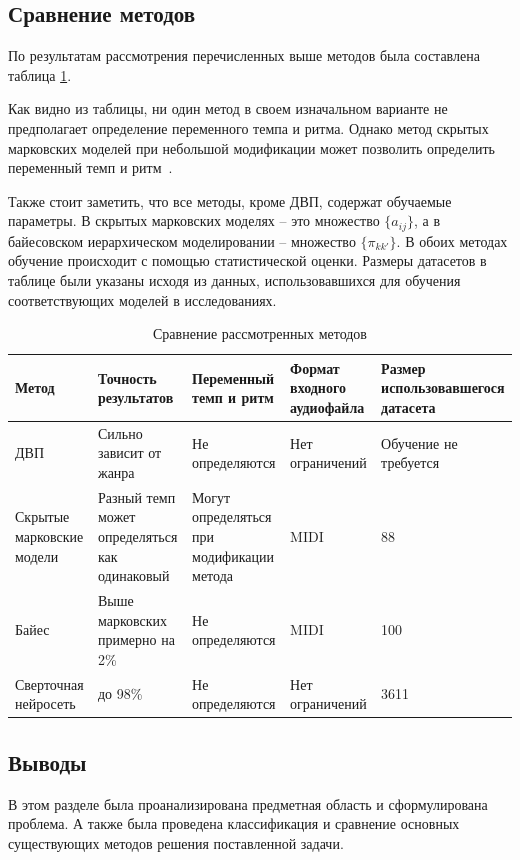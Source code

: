 \subsection{Сравнение методов}

По результатам рассмотрения перечисленных выше методов была составлена таблица \ref{tbl:compare}.

Как видно из таблицы, ни один метод в своем изначальном варианте не предполагает определение переменного темпа и ритма. Однако метод скрытых марковских моделей при небольшой модификации может позволить определить переменный темп и ритм~\cite{hmm}.

Также стоит заметить, что все методы, кроме ДВП, содержат обучаемые параметры. В скрытых марковских моделях -- это множество $\{a_{ij}\}$, а в байесовском иерархическом моделировании -- множество $\{\pi_{kk'}\}$. В обоих методах обучение происходит с помощью статистической оценки. Размеры датасетов в таблице были указаны исходя из данных, использовавшихся для обучения соответствующих моделей в исследованиях.

\begin{table}[h!]
	\begin{center}
		\caption{\label{tbl:compare}Сравнение рассмотренных методов}
		\begin{tabular}{|p{2.5cm}|p{2.5cm}|p{3cm}|p{3cm}|p{3cm}|}
			\hline
			Метод & Точность результатов & Переменный темп и ритм & Формат входного аудиофайла & Размер использовавшегося датасета \\\hline
			ДВП & Сильно зависит от жанра & Не определяются  & Нет ограничений & Обучение не требуется\\\hline
			Скрытые марковские модели & Разный темп может определяться как одинаковый  & Могут определяться при модификации метода & MIDI & 88~\cite{hmm}\\\hline
			Байес & Выше марковских примерно на 2\% & Не определяются  & MIDI & 100~\cite{bayesian}\\\hline
			Сверточная нейросеть & до 98\%  & Не определяются  & Нет ограничений & 3611~\cite{cnn}\\\hline
		\end{tabular}
	\end{center}
\end{table}

\newpage

\subsection*{Выводы}

В этом разделе была проанализирована предметная область и сформулирована проблема. А также была проведена классификация и сравнение основных существующих методов решения поставленной задачи.



